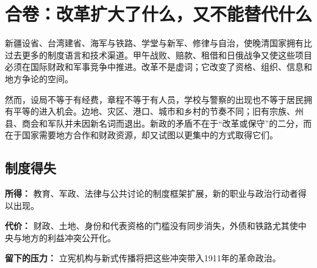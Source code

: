 \section{合卷：改革扩大了什么，又不能替代什么}

新疆设省、台湾建省、海军与铁路、学堂与新军、修律与自治，使晚清国家拥有比过去更多的制度语言和技术渠道。甲午战败、赔款、租借和日俄战争又使这些项目必须在国际财政和军事竞争中推进。改革不是虚词；它改变了资格、组织、信息和地方争论的空间。

然而，设局不等于有经费，章程不等于有人员，学校与警察的出现也不等于居民拥有平等的进入机会。边地、灾区、港口、城市和乡村的节奏不同；旧有宗族、州县、商会和军队并未因新名词而退出。新政的矛盾不在于“改革或保守”的二分，而在于国家需要地方合作和财政资源，却又试图以更集中的方式取得它们。

\subsection{制度得失}

\textbf{所得：} 教育、军政、法律与公共讨论的制度框架扩展，新的职业与政治行动者得以出现。

\textbf{代价：} 财政、土地、身份和代表资格的门槛没有同步消失，外债和铁路尤其使中央与地方的利益冲突公开化。

\textbf{留下的压力：} 立宪机构与新式传播将把这些冲突带入1911年的革命政治。
